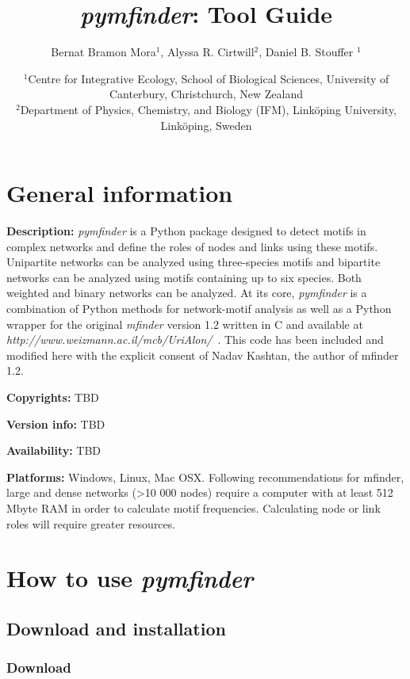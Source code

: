 \documentclass[12pt]{article}
\title{\emph{pymfinder}: Tool Guide}
\author{Bernat Bramon Mora$^{1}$, Alyssa R. Cirtwill$^{2}$, Daniel B. Stouffer $^{1}$}
\date{\small
$^1$Centre for Integrative Ecology, School of Biological Sciences, University of Canterbury, Christchurch, New Zealand\\
\medskip
$^2$Department of Physics, Chemistry, and Biology (IFM), Link\"{o}ping University, Link\"{o}ping, Sweden\\ }
\begin{document}
 
\maketitle 
\raggedright
\setlength{\parindent}{15pt} 

\newpage



\section{General information}

	\textbf{Description:} \textit{pymfinder} is a Python package designed to detect motifs in complex networks and define the roles of nodes and links using these motifs. Unipartite networks can be analyzed using three-species motifs and bipartite networks can be analyzed using motifs containing up to six species. Both weighted and binary networks can be analyzed. At its core, \emph{pymfinder} is a combination of Python methods for network-motif analysis as well as a Python wrapper for the original \emph{mfinder} version 1.2 written in C and available at \emph{http://www.weizmann.ac.il/mcb/UriAlon/}~\citep{Alonwebsite}. This code has been included and modified here with the explicit consent of Nadav Kashtan, the author of mfinder 1.2.

	\textbf{Copyrights:} TBD

	\textbf{Version info:} TBD

	\textbf{Availability:} TBD

	\textbf{Platforms:} Windows, Linux, Mac OSX. Following recommendations for mfinder, large and dense networks (\textgreater10 000 nodes) require a computer with at least 512 Mbyte RAM in order to calculate motif frequencies. Calculating node or link roles will require greater resources.


\section{How to use \emph{pymfinder}}

	\subsection{Download and installation}

		\subsubsection{Download}
\end{document}
